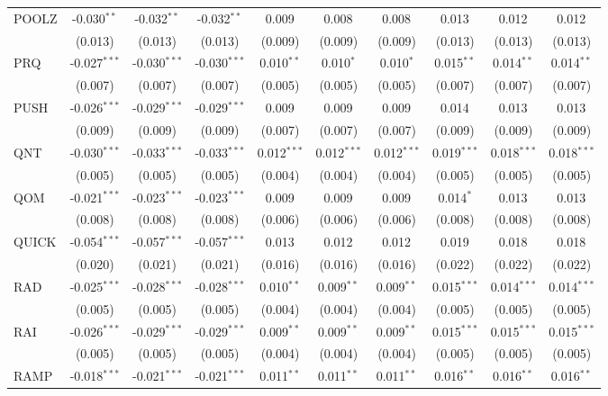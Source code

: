 \begin{table}[!htbp]
\begin{tabular}{@{\extracolsep{5pt}}lccccccccc}
 POOLZ & -0.030$^{**}$ & -0.032$^{**}$ & -0.032$^{**}$ & 0.009$^{}$ & 0.008$^{}$ & 0.008$^{}$ & 0.013$^{}$ & 0.012$^{}$ & 0.012$^{}$ \\
  & (0.013) & (0.013) & (0.013) & (0.009) & (0.009) & (0.009) & (0.013) & (0.013) & (0.013) \\
 PRQ & -0.027$^{***}$ & -0.030$^{***}$ & -0.030$^{***}$ & 0.010$^{**}$ & 0.010$^{*}$ & 0.010$^{*}$ & 0.015$^{**}$ & 0.014$^{**}$ & 0.014$^{**}$ \\
  & (0.007) & (0.007) & (0.007) & (0.005) & (0.005) & (0.005) & (0.007) & (0.007) & (0.007) \\
 PUSH & -0.026$^{***}$ & -0.029$^{***}$ & -0.029$^{***}$ & 0.009$^{}$ & 0.009$^{}$ & 0.009$^{}$ & 0.014$^{}$ & 0.013$^{}$ & 0.013$^{}$ \\
  & (0.009) & (0.009) & (0.009) & (0.007) & (0.007) & (0.007) & (0.009) & (0.009) & (0.009) \\
 QNT & -0.030$^{***}$ & -0.033$^{***}$ & -0.033$^{***}$ & 0.012$^{***}$ & 0.012$^{***}$ & 0.012$^{***}$ & 0.019$^{***}$ & 0.018$^{***}$ & 0.018$^{***}$ \\
  & (0.005) & (0.005) & (0.005) & (0.004) & (0.004) & (0.004) & (0.005) & (0.005) & (0.005) \\
 QOM & -0.021$^{***}$ & -0.023$^{***}$ & -0.023$^{***}$ & 0.009$^{}$ & 0.009$^{}$ & 0.009$^{}$ & 0.014$^{*}$ & 0.013$^{}$ & 0.013$^{}$ \\
  & (0.008) & (0.008) & (0.008) & (0.006) & (0.006) & (0.006) & (0.008) & (0.008) & (0.008) \\
 QUICK & -0.054$^{***}$ & -0.057$^{***}$ & -0.057$^{***}$ & 0.013$^{}$ & 0.012$^{}$ & 0.012$^{}$ & 0.019$^{}$ & 0.018$^{}$ & 0.018$^{}$ \\
  & (0.020) & (0.021) & (0.021) & (0.016) & (0.016) & (0.016) & (0.022) & (0.022) & (0.022) \\
 RAD & -0.025$^{***}$ & -0.028$^{***}$ & -0.028$^{***}$ & 0.010$^{**}$ & 0.009$^{**}$ & 0.009$^{**}$ & 0.015$^{***}$ & 0.014$^{***}$ & 0.014$^{***}$ \\
  & (0.005) & (0.005) & (0.005) & (0.004) & (0.004) & (0.004) & (0.005) & (0.005) & (0.005) \\
 RAI & -0.026$^{***}$ & -0.029$^{***}$ & -0.029$^{***}$ & 0.009$^{**}$ & 0.009$^{**}$ & 0.009$^{**}$ & 0.015$^{***}$ & 0.015$^{***}$ & 0.015$^{***}$ \\
  & (0.005) & (0.005) & (0.005) & (0.004) & (0.004) & (0.004) & (0.005) & (0.005) & (0.005) \\
 RAMP & -0.018$^{***}$ & -0.021$^{***}$ & -0.021$^{***}$ & 0.011$^{**}$ & 0.011$^{**}$ & 0.011$^{**}$ & 0.016$^{**}$ & 0.016$^{**}$ & 0.016$^{**}$ \\

\end{tabular}
\end{table}
